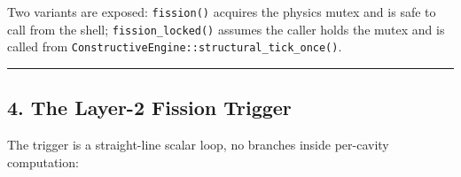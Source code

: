 \documentclass[
  11pt,
  a4paper,
]{article}
\begin{document}
Two variants are exposed: \texttt{fission()} acquires the physics mutex
and is safe to call from the shell; \texttt{fission\_locked()} assumes
the caller holds the mutex and is called from
\texttt{ConstructiveEngine::structural\_tick\_once()}.

\begin{center}\rule{0.5\linewidth}{0.5pt}\end{center}

\subsection{4. The Layer-2 Fission
Trigger}\label{the-layer-2-fission-trigger}

The trigger is a straight-line scalar loop, no branches inside
per-cavity computation:
\end{document}
